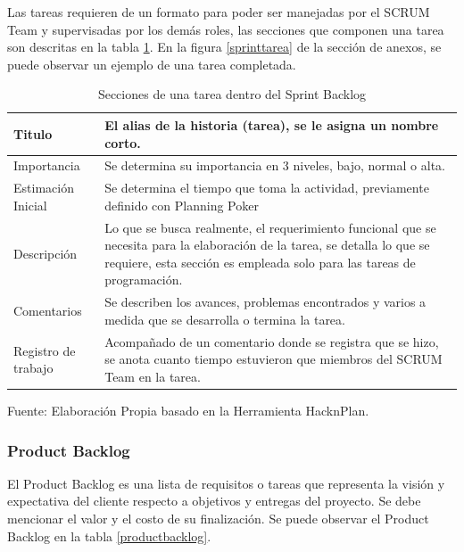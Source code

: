 Las tareas requieren de un formato para poder ser manejadas por el SCRUM Team y supervisadas por los demás roles, las secciones que componen una tarea son descritas en la tabla \ref{sprinttabla}. En la figura \ref{sprinttarea} de la sección de anexos, se puede observar un ejemplo de una tarea completada.

\begin{table}[t]
	\begin{center}
		\begin{tabular}{| m{4cm} | m{10cm} |  }
			\hline Titulo & El alias de la historia (tarea), se le asigna un nombre corto. \\ \hline
			 Importancia & Se determina su importancia en 3 niveles, bajo, normal o alta. \\ \hline
			 Estimación Inicial & Se determina el tiempo que toma la actividad, previamente definido con Planning Poker \\ \hline
			 Descripción & Lo que se busca realmente, el requerimiento funcional que se necesita para la elaboración de la tarea, se detalla lo que se requiere, esta sección es empleada solo para las tareas de programación. \\ \hline
			 Comentarios & Se describen los avances, problemas encontrados y varios a medida que se desarrolla o termina la tarea. \\ \hline
			Registro de trabajo  & Acompañado de un comentario donde se registra que se hizo, se anota cuanto tiempo estuvieron que miembros del SCRUM Team en la tarea. \\ \hline
		\end{tabular}
		\caption{Secciones de una tarea dentro del Sprint Backlog}
		\label{sprinttabla}
		\footnotesize Fuente: Elaboración Propia basado en la Herramienta HacknPlan.
	\end{center}
\end{table}

\subsubsection{Product Backlog}

El Product Backlog es una lista de requisitos o tareas que representa la visión y expectativa del cliente respecto a objetivos y entregas del proyecto. Se debe mencionar el valor y el costo de su finalización. Se puede observar el Product Backlog en la tabla \ref{productbacklog}.

